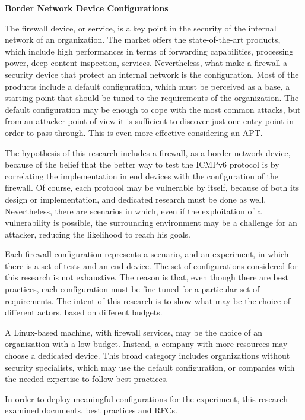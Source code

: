 \documentclass[12pt]{article}
\begin{document}
\textbf{Border Network Device Configurations}
\label{subsub:borderConfig}

The firewall device, or service, is a key point in the security of the internal network of an organization. The market offers the state-of-the-art products, which include high performances in terms of forwarding capabilities, processing power, deep content inspection, services. Nevertheless, what make a firewall a security device that protect an internal network is the configuration. Most of the products include a default configuration, which must be perceived as a base, a starting point that should be tuned to the requirements of the organization. The default configuration may be enough to cope with the most common attacks, but from an attacker point of view it is sufficient to discover just one entry point in order to pass through. This is even more effective considering an APT.

The hypothesis of this research includes a firewall, as a border network device, because of the belief that the better way to test the ICMPv6 protocol is by correlating the implementation in end devices with the configuration of the firewall. Of course, each protocol may be vulnerable by itself, because of both its design or implementation, and dedicated research must be done as well. Nevertheless, there are scenarios in which, even if the exploitation of a vulnerability is possible, the surrounding environment may be a challenge for an attacker, reducing the likelihood to reach his goals.

Each firewall configuration represents a scenario, and an experiment, in which there is a set of tests and an end device. The set of configurations considered for this research is not exhaustive. The reason is that, even though there are best practices, each configuration must be fine-tuned for a particular set of requirements. The intent of this research is to show what may be the choice of different actors, based on different budgets.

A Linux-based machine, with firewall services, may be the choice of an organization with a low budget. Instead, a company with more resources may choose a dedicated device. This broad category includes organizations without security specialists, which may use the default configuration, or companies with the needed expertise to follow best practices. 

In order to deploy meaningful configurations for the experiment, this research examined documents, best practices and RFCs. 
\end{document}
